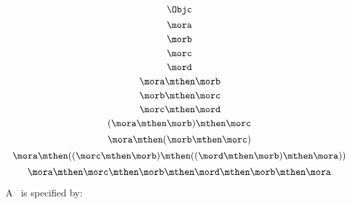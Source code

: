 {\begin{forslides}
        \begin{equation}
            \label{eq:03}
            \Objc
        \end{equation}
%
        \begin{equation}
            \label{eq:04}
            \mora
        \end{equation}
%
        \begin{equation}
            \label{eq:05}
            \morb
        \end{equation}
%
        \begin{equation}
            \label{eq:06}
            \morc
        \end{equation}
%
        \begin{equation}
            \label{eq:07}
            \mord
        \end{equation}
%
        \begin{equation}
            \label{eq:08}
            \mora \mthen \morb
        \end{equation}
%
        \begin{equation}
            \label{eq:09}
            \morb \mthen \morc
        \end{equation}
%
        \begin{equation}
            \label{eq:10}
            \morc \mthen \mord
        \end{equation}
%
        \begin{equation}
            \label{eq:11}
            (\mora \mthen \morb) \mthen \morc
        \end{equation}
%
        \begin{equation}
            \label{eq:12}
            \mora \mthen  (\morb \mthen \morc )
        \end{equation}
%
        \begin{equation}
            \label{eq:13}
            \mora \mthen  ((\morc \mthen \morb ) \mthen (( \mord \mthen \morb ) \mthen \mora ))
        \end{equation}
%
        \begin{equation}
            \label{eq:14}
            \mora \mthen  \morc \mthen \morb  \mthen \mord \mthen \morb  \mthen \mora
        \end{equation}
%
%
        \begin{ctdefinition}
            \label{def:category-var}
            A \emph{}~\CatC is specified by:
            \begin{body}
                \constit
                \begin{compactenum}

\end{compactenum}
\end{body}
\end{ctdefinition}
\end{forslides}}
